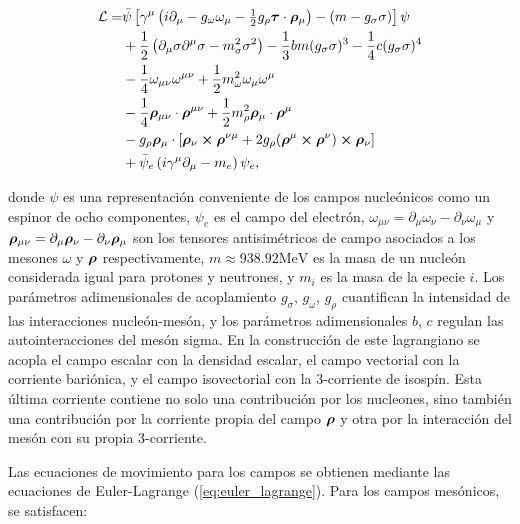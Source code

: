 \begin{equation}
	\begin{aligned}
		\mathcal{L} = &\bar{\psi} \left[ \gamma^\mu \left( i\partial_\mu - g_{\omega} \omega_\mu - \tfrac{1}{2} g_{\rho} \boldsymbol{\tau} \cdot \boldsymbol{\rho}_\mu \right) - (m - g_{\sigma} \sigma) \right] \psi  \\
		&+ \frac{1}{2} \left( \partial_\mu \sigma \partial^\mu \sigma - m_\sigma^2 \sigma^2 \right) - \frac{1}{3}bm (g_\sigma\sigma)^3 - \frac{1}{4}c(g_\sigma\sigma)^4  \\
		&- \frac{1}{4} \omega_{\mu\nu} \omega^{\mu\nu} + \frac{1}{2} m_\omega^2 \omega_\mu \omega^\mu  \\
		&- \frac{1}{4} \boldsymbol{\rho}_{\mu\nu} \cdot \boldsymbol{\rho}^{\mu\nu} + \frac{1}{2} m_\rho^2 \boldsymbol{\rho}_\mu \cdot \boldsymbol{\rho}^\mu \\
		&- g_\rho \boldsymbol{\rho}_\mu \cdot [\boldsymbol{\rho}_\nu \cross \boldsymbol{\rho}^{\nu\mu} + 2g_\rho(\boldsymbol{\rho}^\mu \cross \boldsymbol{\rho}^\nu) \cross \boldsymbol{\rho}_\nu] \\
		&+ \bar{\psi}_e \left( i\gamma^\mu \partial_\mu - m_e \right) \psi_e,
		\label{eq:lagrangiano}
	\end{aligned}
\end{equation}

donde $\psi$ es una representación conveniente de los campos nucleónicos como un espinor de ocho componentes, $\psi_e$ es el campo del electrón, $\omega_{\mu\nu} = \partial_\mu \omega_\nu - \partial_\nu \omega_\mu$ y $\boldsymbol{\rho}_{\mu\nu} = \partial_\mu \boldsymbol{\rho}_\nu - \partial_\nu \boldsymbol{\rho}_\mu$ son los tensores antisimétricos de campo asociados a los mesones $\omega$ y $\boldsymbol{\rho}$ respectivamente, $m \approx 938.92 \text{MeV}$ es la masa de un nucleón considerada igual para protones y neutrones, y $m_i$ es la masa de la especie $i$. Los parámetros adimensionales de acoplamiento $g_{\sigma}$, $g_{\omega}$, $g_{\rho}$ cuantifican la intensidad de las interacciones nucleón-mesón, y los parámetros adimensionales $b$, $c$ regulan las autointeracciones del mesón sigma. En la construcción de este lagrangiano se acopla el campo escalar con la densidad escalar, el campo vectorial con la corriente bariónica, y el campo isovectorial con la 3-corriente de isospín. Esta última corriente contiene no solo una contribución por los nucleones, sino también una contribución por la corriente propia del campo $\boldsymbol{\rho}$ y otra por la interacción del mesón con su propia 3-corriente.

Las ecuaciones de movimiento para los campos se obtienen mediante las ecuaciones de Euler-Lagrange (\ref{eq:euler_lagrange}). Para los campos mesónicos, se satisfacen:

